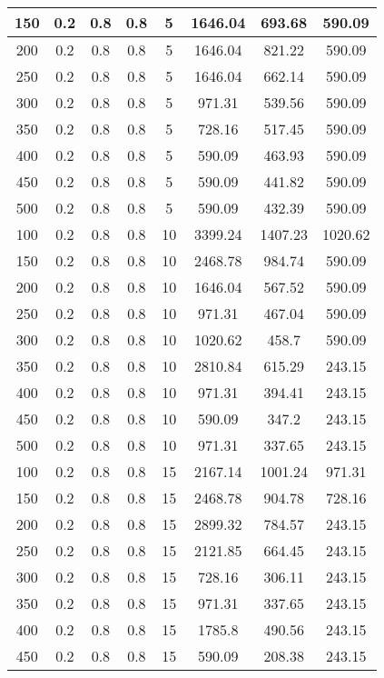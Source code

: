 \documentclass[a4paper, 12pt]{extreport}
\begin{document}
\begin{itemize}
\begin{longtable}{|c|c|c|c|c|c|c|c|}
			150 & 0.2 & 0.8 & 0.8 & 5 & 1646.04 & 693.68 & 590.09 \\\hline
			200 & 0.2 & 0.8 & 0.8 & 5 & 1646.04 & 821.22 & 590.09 \\\hline
			250 & 0.2 & 0.8 & 0.8 & 5 & 1646.04 & 662.14 & 590.09 \\\hline
			300 & 0.2 & 0.8 & 0.8 & 5 & 971.31 & 539.56 & 590.09 \\\hline
			350 & 0.2 & 0.8 & 0.8 & 5 & 728.16 & 517.45 & 590.09 \\\hline
			400 & 0.2 & 0.8 & 0.8 & 5 & 590.09 & 463.93 & 590.09 \\\hline
			450 & 0.2 & 0.8 & 0.8 & 5 & 590.09 & 441.82 & 590.09 \\\hline
			500 & 0.2 & 0.8 & 0.8 & 5 & 590.09 & 432.39 & 590.09 \\\hline
			100 & 0.2 & 0.8 & 0.8 & 10 & 3399.24 & 1407.23 & 1020.62 \\\hline
			150 & 0.2 & 0.8 & 0.8 & 10 & 2468.78 & 984.74 & 590.09 \\\hline
			200 & 0.2 & 0.8 & 0.8 & 10 & 1646.04 & 567.52 & 590.09 \\\hline
			250 & 0.2 & 0.8 & 0.8 & 10 & 971.31 & 467.04 & 590.09 \\\hline
			300 & 0.2 & 0.8 & 0.8 & 10 & 1020.62 & 458.7 & 590.09 \\\hline
			350 & 0.2 & 0.8 & 0.8 & 10 & 2810.84 & 615.29 & 243.15 \\\hline
			400 & 0.2 & 0.8 & 0.8 & 10 & 971.31 & 394.41 & 243.15 \\\hline
			450 & 0.2 & 0.8 & 0.8 & 10 & 590.09 & 347.2 & 243.15 \\\hline
			500 & 0.2 & 0.8 & 0.8 & 10 & 971.31 & 337.65 & 243.15 \\\hline
			100 & 0.2 & 0.8 & 0.8 & 15 & 2167.14 & 1001.24 & 971.31 \\\hline
			150 & 0.2 & 0.8 & 0.8 & 15 & 2468.78 & 904.78 & 728.16 \\\hline
			200 & 0.2 & 0.8 & 0.8 & 15 & 2899.32 & 784.57 & 243.15 \\\hline
			250 & 0.2 & 0.8 & 0.8 & 15 & 2121.85 & 664.45 & 243.15 \\\hline
			300 & 0.2 & 0.8 & 0.8 & 15 & 728.16 & 306.11 & 243.15 \\\hline
			350 & 0.2 & 0.8 & 0.8 & 15 & 971.31 & 337.65 & 243.15 \\\hline
			400 & 0.2 & 0.8 & 0.8 & 15 & 1785.8 & 490.56 & 243.15 \\\hline
			450 & 0.2 & 0.8 & 0.8 & 15 & 590.09 & 208.38 & 243.15 \\\hline

\end{longtable}
\end{itemize}
\end{document}
